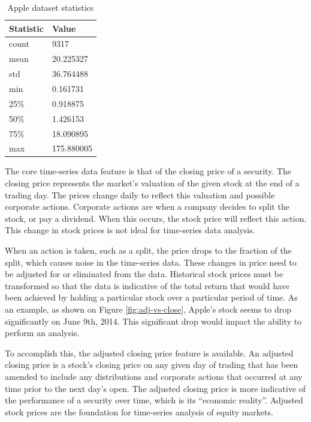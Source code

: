 \documentclass[11pt]{article}
\begin{document}
\begin{table}[]
\centering
\begin{tabular}{@{}ll@{}}
\toprule
Statistic & Value      \\ \midrule
count     & 9317       \\
mean      & 20.225327  \\
std       & 36.764488  \\
min       & 0.161731   \\
25\%      & 0.918875   \\
50\%      & 1.426153   \\
75\%      & 18.090895  \\
max       & 175.880005 \\ \bottomrule
\end{tabular}
\caption{Apple dataset statistics}
\label{tab:apple-stock-stats}
\end{table}

The core time-series data feature is that of the closing price of a security. The closing price represents the market's valuation of the given stock at the end of a trading day. The prices change daily to reflect this valuation and possible corporate actions. Corporate actions are when a company decides to split the stock, or pay a dividend. When this occurs, the stock price will reflect this action. This change in stock prices is not ideal for time-series data analysis.

When an action is taken, such as a split, the price drops to the fraction of the split, which causes noise in the time-series data. These changes in price need to be adjusted for or eliminated from the data. Historical stock prices must be transformed so that the data is indicative of the total return that would have been achieved by holding a particular stock over a particular period of time. As an example, as shown on Figure \ref{fig:adj-vs-close}, Apple's stock seems to drop significantly on June 9th, 2014. This significant drop would impact the ability to perform an analysis.

To accomplish this, the adjusted closing price feature is available. An adjusted closing price is a stock's closing price on any given day of trading that has been amended to include any distributions and corporate actions that occurred at any time prior to the next day's open. The adjusted closing price is more indicative of the performance of a security over time, which is its ``economic reality''. Adjusted stock prices are the foundation for time-series analysis of equity markets.
\end{document}

